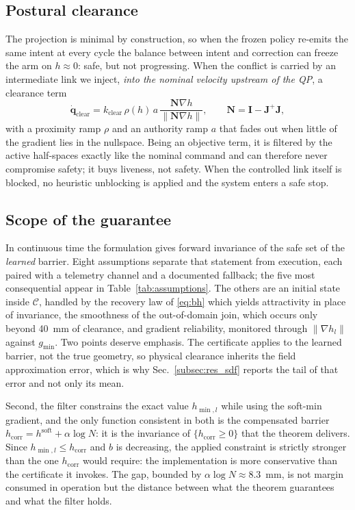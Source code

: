 \documentclass[journal]{IEEEtran}
\newcommand{\qdot}{\dot{\mathbf{q}}}
\begin{document}
\subsection{Postural clearance}
The projection is minimal by construction, so when the frozen policy re-emits the same intent at every cycle the balance between intent and correction can freeze the arm on $h\approx0$: safe, but not progressing. When the conflict is carried by an intermediate link we inject, \emph{into the nominal velocity upstream of the QP}, a clearance term
\begin{equation}
\qdot_{\mathrm{clear}}=k_{\mathrm{clear}}\,\rho(h)\,a\,\frac{\mathbf{N}\nabla h}{\|\mathbf{N}\nabla h\|},\qquad \mathbf{N}=\mathbf{I}-\mathbf{J}^{+}\mathbf{J},
\end{equation}
with a proximity ramp $\rho$ and an authority ramp $a$ that fades out when little of the gradient lies in the nullspace. Being an objective term, it is filtered by the active half-spaces exactly like the nominal command and can therefore never compromise safety; it buys liveness, not safety. When the controlled link itself is blocked, no heuristic unblocking is applied and the system enters a safe stop.

\subsection{Scope of the guarantee}\label{subsec:scope}
In continuous time the formulation gives forward invariance of the safe set of the \emph{learned} barrier. Eight assumptions separate that statement from execution, each paired with a telemetry channel and a documented fallback; the five most consequential appear in Table~\ref{tab:assumptions}. The others are an initial state inside $\mathcal{C}$, handled by the recovery law of \eqref{eq:bh} which yields attractivity in place of invariance, the smoothness of the out-of-domain join, which occurs only beyond 40~mm of clearance, and gradient reliability, monitored through $\|\nabla h_l\|$ against $g_{\min}$. Two points deserve emphasis. The certificate applies to the learned barrier, not the true geometry, so physical clearance inherits the field approximation error, which is why Sec.~\ref{subsec:res_sdf} reports the tail of that error and not only its mean.

Second, the filter constrains the exact value $h_{\min,l}$ while using the soft-min gradient, and the only function consistent in both is the compensated barrier $h_{\mathrm{corr}}=h^{\mathrm{soft}}+\alpha\log N$: it is the invariance of $\{h_{\mathrm{corr}}\ge0\}$ that the theorem delivers. Since $h_{\min,l}\le h_{\mathrm{corr}}$ and $b$ is decreasing, the applied constraint is strictly stronger than the one $h_{\mathrm{corr}}$ would require: the implementation is more conservative than the certificate it invokes. The gap, bounded by $\alpha\log N\approx8.3$~mm, is not margin consumed in operation but the distance between what the theorem guarantees and what the filter holds.
\end{document}
